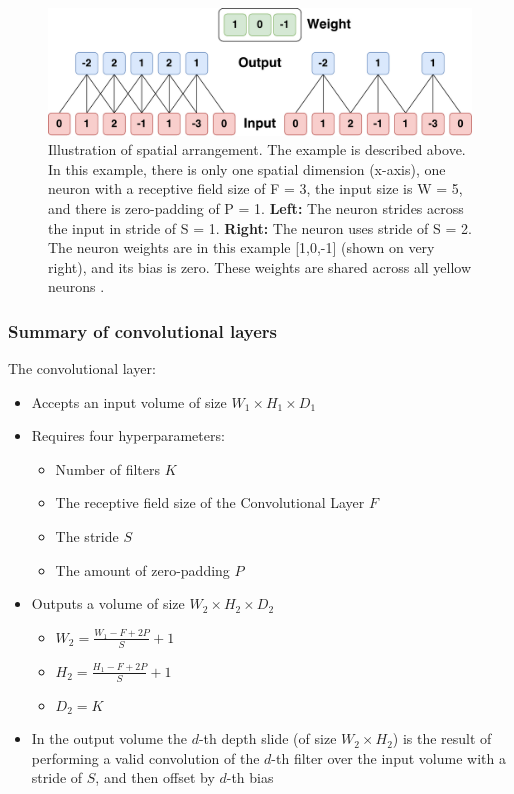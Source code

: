 \begin{figure}[H]
	\centering
	\includegraphics[width=1\textwidth]{Figures/Spatial_size.pdf}
	\caption{Illustration of spatial arrangement. The example is described above. In this example, there is only one spatial dimension (x-axis), one neuron with a receptive field size of F = 3, the input size is W = 5, and there is zero-padding of P = 1. \textbf{Left:} The neuron strides across the input in stride of S = 1. \textbf{Right:} The neuron uses stride of S = 2.
		The neuron weights are in this example [1,0,-1] (shown on very right), and its bias is zero. These weights are shared across all yellow neurons
		 \cite{CNN_course}.
	}
	\label{fig:Spatial_size}
\end{figure} 
\newpage
\subsubsection{Summary of convolutional layers}
The convolutional layer:
\begin{itemize}
	\item Accepts an input volume of size $W_1 \times  H_1 \times  D_1$
	\item Requires four hyperparameters:
	\begin{itemize}
		\item Number of filters $K$
		\item The receptive field size of the Convolutional Layer $F$ 
		\item The stride $S$
		\item The amount of zero-padding $P$ 
	\end{itemize}
	\item Outputs a volume of size $W_2 \times  H_2 \times  D_2$
	\begin{itemize}
		\item $W_2 = \frac{W_1-F+2P}{S}+1$
		\item $H_2 = \frac{H_1-F+2P}{S}+1$
		\item $D_2 = K$
	\end{itemize}
	\item In the output volume the $d$-th depth slide (of size $W_2 \times  H_2$) is the result of performing a valid convolution of the $d$-th filter over the input volume with a stride of $S$, and then offset by $d$-th bias
\end{itemize}

